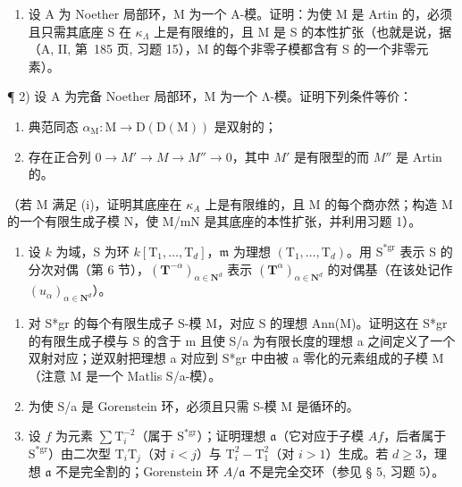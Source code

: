 
\begin{enumerate}
\def\labelenumi{\arabic{enumi})}
\tightlist
\item
  设 A 为 Noether 局部环，M 为一个 A-模。证明：为使 M 是 Artin 的，必须且只需其底座 S 在 \(\kappa_{\Lambda}\) 上是有限维的，且 M 是 S 的本性扩张（也就是说，据（A, II, 第~185 页, 习题 15），M 的每个非零子模都含有 S 的一个非零元素）。
\end{enumerate}

¶ 2) 设 A 为完备 Noether 局部环，M 为一个 Λ-模。证明下列条件等价：

\begin{enumerate}
\def\labelenumi{(\roman{enumi})}
\item
  典范同态 \(\alpha_{\mathrm{M}}: \mathrm{M} \to \mathrm{D}(\mathrm{D}(\mathrm{M}))\) 是双射的；
\item
  存在正合列 \(0 \to M' \to M \to M'' \to 0\)，其中 \(M'\) 是有限型的而 \(M''\) 是 Artin 的。
\end{enumerate}

（若 M 满足 (i)，证明其底座在 \(\kappa_{A}\) 上是有限维的，且 M 的每个商亦然；构造 M 的一个有限生成子模 N，使 M/mN 是其底座的本性扩张，并利用习题 1）。

\begin{enumerate}
\def\labelenumi{\arabic{enumi})}
\setcounter{enumi}{2}
\tightlist
\item
  设 \(k\) 为域，S 为环 \(k[\mathrm{T}_{1},\ldots ,\mathrm{T}_{d}]\)，\(\mathfrak{m}\) 为理想 \((\mathrm{T}_1,\dots ,\mathrm{T}_d)\)。用 \(\mathrm{S^{*gr}}\) 表示 S 的分次对偶（第 6 节），\((\mathbf{T}^{-\alpha})_{\alpha \in \mathbf{N}^d}\) 表示 \((\mathbf{T}^{\alpha})_{\alpha \in \mathbf{N}^d}\) 的对偶基（在该处记作 \((u_{\alpha})_{\alpha \in \mathbf{N}^d}\)）。
\end{enumerate}

\begin{enumerate}
\def\labelenumi{\alph{enumi})}
\item
  对 S*gr 的每个有限生成子 S-模 M，对应 S 的理想 Ann(M)。证明这在 S*gr 的有限生成子模与 S 的含于 m 且使 S/a 为有限长度的理想 a 之间定义了一个双射对应；逆双射把理想 a 对应到 S*gr 中由被 a 零化的元素组成的子模 M（注意 M 是一个 Matlis S/a-模）。
\item
  为使 S/a 是 Gorenstein 环，必须且只需 S-模 M 是循环的。
\item
  设 \(f\) 为元素 \(\sum \mathrm{T}_i^{-2}\)（属于 \(\mathrm{S}^{*\mathrm{gr}}\)）；证明理想 \(\mathfrak{a}\)（它对应于子模 \(A f\)，后者属于 \(\mathrm{S}^{*\mathrm{gr}}\)）由二次型 \(\mathrm{T}_i\mathrm{T}_j\)（对 \(i < j\)）与 \(\mathrm{T}_i^2 - \mathrm{T}_1^2\)（对 \(i > 1\)）生成。若 \(d \geqslant 3\)，理想 \(\mathfrak{a}\) 不是完全割的；Gorenstein 环 \(A / \mathfrak{a}\) 不是完全交环（参见 § 5, 习题 5）。
\end{enumerate}

